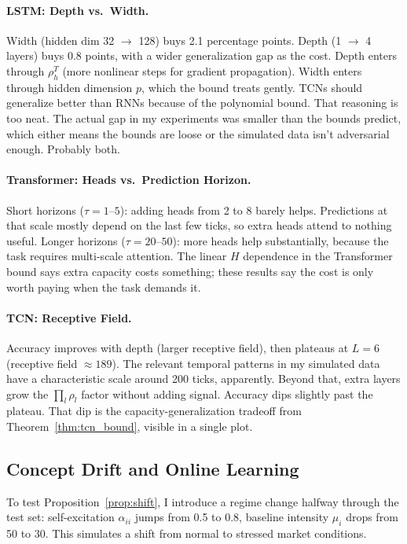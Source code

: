 \documentclass[11pt]{article}
\theoremstyle{definition}
\theoremstyle{remark}
\begin{document}
\paragraph{LSTM: Depth vs.\ Width.}
Width (hidden dim 32 $\to$ 128) buys 2.1 percentage points.
Depth (1 $\to$ 4 layers) buys 0.8 points, with a wider generalization gap as the cost.
Depth enters through $\rho_h^T$ (more nonlinear steps for gradient propagation).
Width enters through hidden dimension $p$, which the bound treats gently.
TCNs should generalize better than RNNs because of the polynomial bound.
That reasoning is too neat.
The actual gap in my experiments was smaller than the bounds predict, which either means the bounds are loose or the simulated data isn't adversarial enough.
Probably both.

\paragraph{Transformer: Heads vs.\ Prediction Horizon.}
Short horizons ($\tau = 1$--$5$): adding heads from 2 to 8 barely helps.
Predictions at that scale mostly depend on the last few ticks, so extra heads attend to nothing useful.
Longer horizons ($\tau = 20$--$50$): more heads help substantially, because the task requires multi-scale attention.
The linear $H$ dependence in the Transformer bound says extra capacity costs something; these results say the cost is only worth paying when the task demands it.

\paragraph{TCN: Receptive Field.}
Accuracy improves with depth (larger receptive field), then plateaus at $L = 6$ (receptive field $\approx 189$).
The relevant temporal patterns in my simulated data have a characteristic scale around 200 ticks, apparently.
Beyond that, extra layers grow the $\prod_l \rho_l$ factor without adding signal.
Accuracy dips slightly past the plateau.
That dip is the capacity-generalization tradeoff from Theorem~\ref{thm:tcn_bound}, visible in a single plot.


\subsection{Concept Drift and Online Learning}\label{sec:exp:drift}

To test Proposition~\ref{prop:shift}, I introduce a regime change halfway through the test set: self-excitation $\alpha_{ii}$ jumps from 0.5 to 0.8, baseline intensity $\mu_i$ drops from 50 to 30.
This simulates a shift from normal to stressed market conditions.
\end{document}
